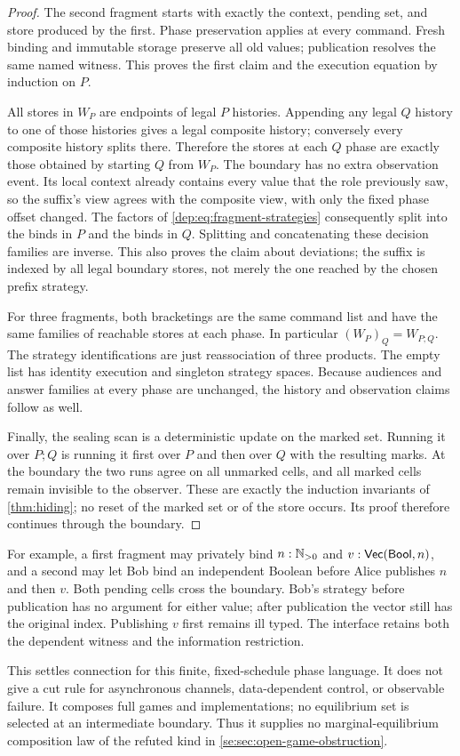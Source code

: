 \begin{proof}
The second fragment starts with exactly the context, pending set, and
store produced by the first. Phase preservation applies at every
command. Fresh binding and immutable storage preserve all old values;
publication resolves the same named witness. This proves the first
claim and the execution equation by induction on $P$.

All stores in $W_P$ are endpoints of legal $P$ histories. Appending any
legal $Q$ history to one of those histories gives a legal composite
history; conversely every composite history splits there. Therefore
the stores at each $Q$ phase are exactly those obtained by starting
$Q$ from $W_P$. The boundary has no extra observation event. Its
local context already contains every value that the role previously
saw, so the suffix's view agrees with the composite view, with only
the fixed phase offset changed. The factors of
\eqref{dep:eq:fragment-strategies} consequently split into the binds
in $P$ and the binds in $Q$. Splitting and concatenating these decision
families are inverse. This also proves the claim about deviations;
the suffix is indexed by all legal boundary stores, not merely the
one reached by the chosen prefix strategy.

For three fragments, both bracketings are the same command list and
have the same families of reachable stores at each phase. In
particular $(W_P)_Q=W_{P;Q}$. The strategy identifications are just
reassociation of three products. The empty list has identity execution
and singleton strategy spaces. Because audiences and answer families
at every phase are unchanged, the history and observation claims
follow as well.

Finally, the sealing scan is a deterministic update on the marked
set. Running it over $P;Q$ is running it first over $P$ and then
over $Q$ with the resulting marks. At the boundary the two runs
agree on all unmarked cells, and all marked cells remain invisible
to the observer. These are exactly the induction invariants of
\cref{thm:hiding}; no reset of the marked set or of the store occurs.
Its proof therefore continues through the boundary.
\end{proof}

For example, a first fragment may privately bind $n:\mathbb N_{>0}$ and
$v:\mathsf{Vec}(\mathsf{Bool},n)$, and a second may let Bob bind an independent
Boolean before Alice publishes $n$ and then $v$. Both pending cells
cross the boundary. Bob's strategy before publication has no argument
for either value; after publication the vector still has the original
index. Publishing $v$ first remains ill typed. The interface retains
both the dependent witness and the information restriction.

This settles connection for this finite, fixed-schedule phase
language. It does not give a cut rule for asynchronous channels,
data-dependent control, or observable failure. It composes full games and implementations;
no equilibrium set is selected at an intermediate boundary. Thus it
supplies no marginal-equilibrium composition law of the refuted kind
in \cref{se:sec:open-game-obstruction}.

